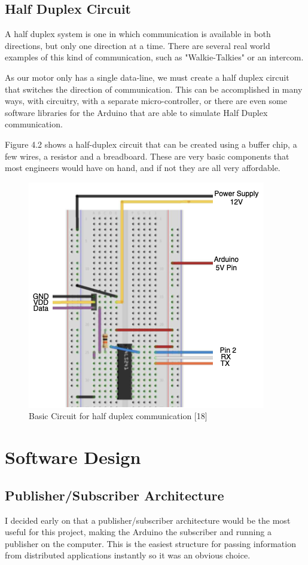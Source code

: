 \documentclass{l4proj}
\begin{document}
\subsection{Half Duplex Circuit}
A half duplex system is one in which communication is available in both directions, but only one direction at a time. There are several real world examples of this kind of communication, such as "Walkie-Talkies" or an intercom. 

As our motor only has a single data-line, we must create a half duplex circuit that switches the direction of communication. This can be accomplished in many ways, with circuitry, with a separate micro-controller, or there are even some software libraries for the Arduino that are able to simulate Half Duplex communication.

Figure 4.2 shows a half-duplex circuit that can be created using a buffer chip, a few wires, a resistor and a breadboard. These are very basic components that most engineers would have on hand, and if not they are all very affordable. 

\begin{figure}[!ht]
  \centering
  \includegraphics[width=0.75\linewidth]{images/half_dup_comm.png}   
  \caption{Basic Circuit for half duplex communication [18]}
  \label{fig:image1} 
\end{figure}

\section{Software Design}
\subsection{Publisher/Subscriber Architecture}
I decided early on that a publisher/subscriber architecture would be the most useful for this project, making the Arduino the subscriber and running a publisher on the computer. This is the easiest structure for passing information from distributed applications instantly so it was an obvious choice. 
\end{document}
